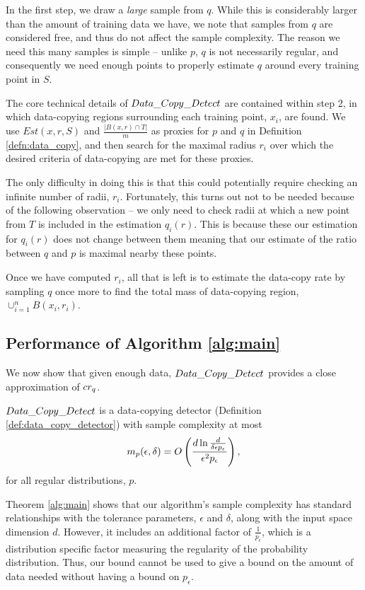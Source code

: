 In the first step, we draw a \textit{large} sample from $q$. While this is considerably larger than the amount of training data we have, we note that samples from $q$ are considered free, and thus do not affect the sample complexity. The reason we need this many samples is simple -- unlike $p$, $q$ is not necessarily regular, and consequently we need enough points to properly estimate $q$ around every training point in $S$.

The core technical details of $Data\_Copy\_Detect{}$ are contained within step 2, in which data-copying regions surrounding each training point, $x_i$, are found. We use $Est(x, r, S)$ and $\frac{|B(x, r) \cap T|}{m}$ as proxies for $p$ and $q$ in Definition \ref{defn:data_copy}, and then search for the maximal radius $r_i$ over which the desired criteria of data-copying are met for these proxies.  

The only difficulty in doing this is that this could potentially require checking an infinite number of radii, $r_i$. Fortunately, this turns out not to be needed because of the following observation -- we only need to check radii at which a new point from $T$ is included in the estimation $q_i(r)$. This is because these our estimation for $q_i(r)$ does not change between them meaning that our estimate of the ratio between $q$ and $p$ is maximal nearby these points. 

Once we have computed $r_i$, all that is left is to estimate the data-copy rate by sampling $q$ once more to find the total mass of data-copying region, $\cup_{i=1}^n B(x_i, r_i)$. 

\subsection{Performance of Algorithm \ref{alg:main}}

We now show that given enough data, $Data\_Copy\_Detect{}$ provides a close approximation of $cr_q$. 

\begin{theorem}\label{thm:upper_bound5}
$Data\_Copy\_Detect{}$ is a data-copying detector (Definition \ref{def:data_copy_detector}) with sample complexity at most $$m_p(\epsilon, \delta) = O\left(\frac{d\ln\frac{d}{\delta\epsilon p_\epsilon}}{\epsilon^2 p_\epsilon}\right),$$ for all regular distributions, $p$. 
\end{theorem}

Theorem \ref{alg:main} shows that our algorithm's sample complexity has standard relationships with the tolerance parameters, $\epsilon$ and $\delta$, along with the input space dimension $d$. However, it includes an additional factor of $\frac{1}{p_\epsilon}$, which is a distribution specific factor measuring the regularity of the probability distribution. Thus, our bound cannot be used to give a bound on the amount of data needed without having a bound on $p_\epsilon$. 

